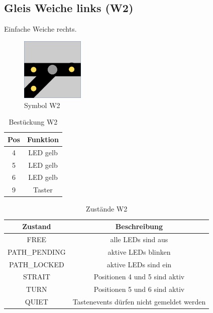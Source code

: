 \documentclass[10pt,a4paper]{article}
\begin{document}
\subsection{Gleis Weiche links (W2)}
Einfache Weiche rechts.
\begin{figure}[hbtp]
\centering
\includegraphics[width=3cm]{../folien/w2.png}
\caption{Symbol W2}
\end{figure}
\begin{table}[h!]
\centering
\begin{tabular}{c|c}
\textbf{Pos} & \textbf{Funktion} \\ \hline
4 & LED gelb \\
5 & LED gelb \\
6 & LED gelb \\
9 & Taster
\end{tabular}
\caption{Bestückung W2}
\end{table}
\begin{table}[h!]
\centering
\begin{tabular}{c|c}
\textbf{Zustand} & \textbf{Beschreibung} \\ \hline
FREE & alle LEDs sind aus \\
PATH\_PENDING & aktive LEDs blinken \\
PATH\_LOCKED & aktive LEDs sind ein \\
STRAIT & Positionen 4 und 5 sind aktiv \\
TURN & Positionen 5 und 6 sind aktiv\\
QUIET & Tastenevents dürfen nicht gemeldet werden
\end{tabular}
\caption{Zustände W2}
\end{table}

\newpage
\end{document}
